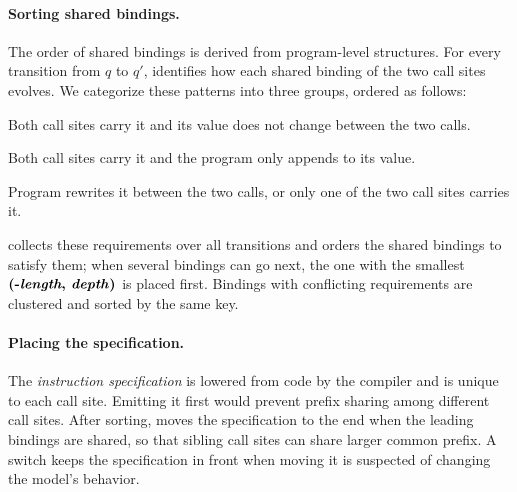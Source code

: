 \paragraph{Sorting shared bindings.} The order of shared bindings is derived from program-level structures. For every transition from $q$ to $q'$, \staticAnalysis identifies how each shared binding of the two call sites evolves. We categorize these patterns into three groups, ordered as follows:
\begin{enumerate*}[label=(\textbf{\roman*})]
    \item Both call sites carry it and its value does not change between the two calls.
    \item Both call sites carry it and the program only appends to its value.
    \item Program rewrites it between the two calls, or only one of the two call sites carries it.
\end{enumerate*}

\sysname collects these requirements over all transitions and orders the shared bindings to satisfy them; when several bindings can go next, the one with the smallest $\textbf{(-\textit{length}, \textit{depth})}$ is placed first. Bindings with conflicting requirements are clustered and sorted by the same key.

\paragraph{Placing the specification.} The \emph{instruction specification} is lowered from code by the compiler and is unique to each call site. Emitting it first would prevent prefix sharing among different call sites. After sorting, \sysname moves the specification to the end when the leading bindings are shared, so that sibling call sites can share larger common prefix. A switch keeps the specification in front when moving it is suspected of changing the model's behavior.

